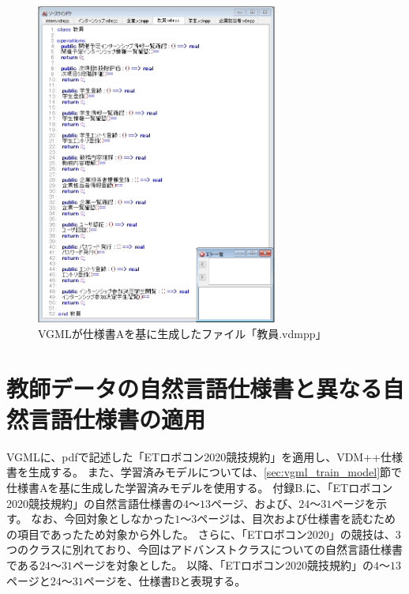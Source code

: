 \begin{figure}[tp]
    \begin{center}
    \includegraphics[width=300]{image/indication_vdm6.PNG}
    \caption{VGMLが仕様書Aを基に生成したファイル「教員.vdmpp」}
    \label{fig:indication_vdm6}
    \end{center}
\end{figure}

\section{教師データの自然言語仕様書と異なる自然言語仕様書の適用}
\label{sec:different_generate_vdm}

VGMLに、pdfで記述した「ETロボコン2020競技規約」\cite{ET_robo}を適用し、VDM++仕様書を生成する。
また、学習済みモデルについては、\ref{sec:vgml_train_model}節で仕様書Aを基に生成した学習済みモデルを使用する。
付録B.に、「ETロボコン2020競技規約」の自然言語仕様書の$4～13$ページ、および、$24～31$ページを示す。
なお、今回対象としなかった$1～3$ページは、目次および仕様書を読むための項目であったため対象から外した。
さらに、「ETロボコン2020」の競技は、3つのクラスに別れており、今回はアドバンストクラスについての自然言語仕様書である$24～31$ページを対象とした。
以降、「ETロボコン2020競技規約」の$4～13$ページと$24～31$ページを、仕様書Bと表現する。

